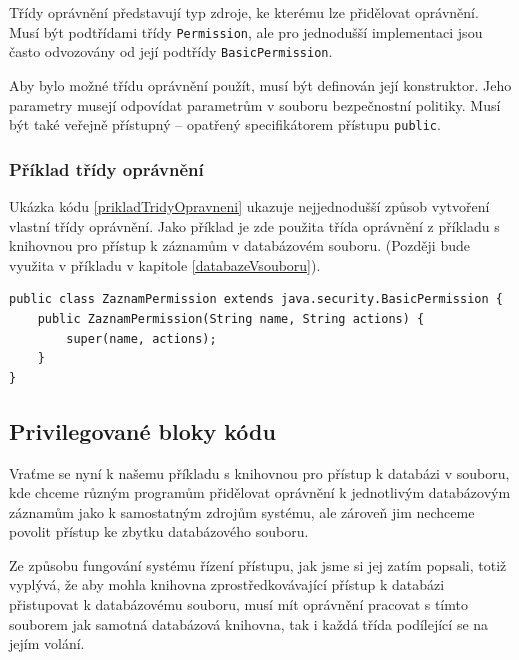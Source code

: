 Třídy oprávnění představují typ zdroje, ke kterému lze přidělovat oprávnění. Musí být podtřídami třídy {\tt Permission}, ale pro jednodušší implementaci jsou často odvozovány od její podtřídy {\tt BasicPermission}.

Aby bylo možné třídu oprávnění použít, musí být definován její konstruktor. Jeho parametry musejí odpovídat parametrům v souboru bezpečnostní politiky. Musí být také veřejně přístupný -- opatřený specifikátorem přístupu {\tt public}.

\subsubsection{Příklad třídy oprávnění} \label{zaznamPerm}

Ukázka kódu \ref{prikladTridyOpravneni} ukazuje nejjednodušší způsob vytvoření vlastní třídy oprávnění. Jako příklad je zde použita třída oprávnění z příkladu s knihovnou pro přístup k záznamům v databázovém souboru. (Později bude využita v příkladu v kapitole \ref{databazeVsouboru}).

\begin{lstlisting}[caption=Demonstrační třída oprávnění, label=prikladTridyOpravneni]
public class ZaznamPermission extends java.security.BasicPermission {
    public ZaznamPermission(String name, String actions) {
        super(name, actions);
    }
}
\end{lstlisting}

\subsection{Privilegované bloky kódu}\label{privilegovaneBloky}

Vraťme se nyní k našemu příkladu s knihovnou pro přístup k databázi v souboru, kde chceme různým programům přidělovat oprávnění k jednotlivým databázovým záznamům jako k samostatným zdrojům systému, ale zároveň jim nechceme povolit přístup ke zbytku databázového souboru.

Ze způsobu fungování systému řízení přístupu, jak jsme si jej zatím popsali, totiž vyplývá, že aby mohla knihovna zprostředkovávající přístup k databázi přistupovat k databázovému souboru, musí mít oprávnění pracovat s tímto souborem jak samotná databázová knihovna, tak i každá třída podílející se na jejím volání.

